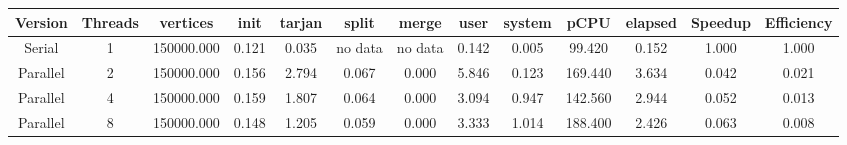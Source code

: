 \begin{tabular}{|c|c|c|c|c|c|c|c|c|c|c|c|c|}
\toprule
 Version &  Threads &   vertices &  init &  tarjan &   split &   merge &  user &  system &    pCPU &  elapsed &  Speedup &  Efficiency \\
\midrule
  Serial &        1 & 150000.000 & 0.121 &   0.035 & no data & no data & 0.142 &   0.005 &  99.420 &    0.152 &    1.000 &       1.000 \\
Parallel &        2 & 150000.000 & 0.156 &   2.794 &   0.067 &   0.000 & 5.846 &   0.123 & 169.440 &    3.634 &    0.042 &       0.021 \\
Parallel &        4 & 150000.000 & 0.159 &   1.807 &   0.064 &   0.000 & 3.094 &   0.947 & 142.560 &    2.944 &    0.052 &       0.013 \\
Parallel &        8 & 150000.000 & 0.148 &   1.205 &   0.059 &   0.000 & 3.333 &   1.014 & 188.400 &    2.426 &    0.063 &       0.008 \\
\bottomrule
\end{tabular}
